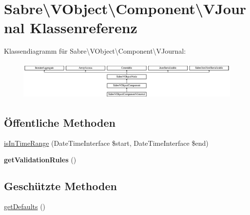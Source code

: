 \hypertarget{class_sabre_1_1_v_object_1_1_component_1_1_v_journal}{}\section{Sabre\textbackslash{}V\+Object\textbackslash{}Component\textbackslash{}V\+Journal Klassenreferenz}
\label{class_sabre_1_1_v_object_1_1_component_1_1_v_journal}
Klassendiagramm für Sabre\textbackslash{}V\+Object\textbackslash{}Component\textbackslash{}V\+Journal\+:\begin{figure}[H]
\begin{center}
\leavevmode
\includegraphics[height=1.973568cm]{class_sabre_1_1_v_object_1_1_component_1_1_v_journal}
\end{center}
\end{figure}
\subsection*{Öffentliche Methoden}
\begin{DoxyCompactItemize}
\item 
\mbox{\hyperlink{class_sabre_1_1_v_object_1_1_component_1_1_v_journal_a7f2c2e3b5ee038e1fbb374c99c3ece56}{is\+In\+Time\+Range}} (Date\+Time\+Interface \$start, Date\+Time\+Interface \$end)
\item 
\mbox{\label{class_sabre_1_1_v_object_1_1_component_1_1_v_journal_a8a6bfb7b19af3cbb68bd831443fa1485}} 
{\bfseries get\+Validation\+Rules} ()
\end{DoxyCompactItemize}
\subsection*{Geschützte Methoden}
\begin{DoxyCompactItemize}
\item 
\mbox{\hyperlink{class_sabre_1_1_v_object_1_1_component_1_1_v_journal_ac481d886ffa080ec747dda96d274bff5}{get\+Defaults}} ()
\end{DoxyCompactItemize}
